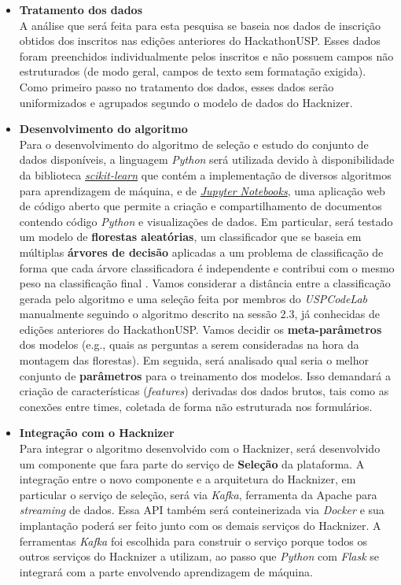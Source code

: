 \documentclass[10pt,twoside,a4paper]{article}
\begin{document}
      \begin{itemize}
          \item \textbf{Tratamento dos dados} \\
          A análise que será feita para esta pesquisa se baseia nos dados de inscrição obtidos dos inscritos nas edições anteriores do HackathonUSP. Esses dados foram preenchidos individualmente pelos inscritos e não possuem campos não estruturados (de modo geral, campos de texto sem formatação exigida). Como primeiro passo no tratamento dos dados, esses dados serão uniformizados e agrupados segundo o modelo de dados do Hacknizer.
      
          \item \textbf{Desenvolvimento do algoritmo} \\
          Para o desenvolvimento do algoritmo de seleção e estudo do conjunto de dados disponíveis, a linguagem \textit{Python} será utilizada devido à disponibilidade da biblioteca \href{http://scikit-learn.org}{\textit{scikit-learn}} que contém a implementação de diversos algoritmos para aprendizagem de máquina, e de \href{http://jupyter.org/}{\textit{Jupyter Notebooks}}, uma aplicação web de código aberto que permite a criação e compartilhamento de documentos contendo código \textit{Python} e visualizações de dados. Em particular, será testado um modelo de \textbf{florestas aleatórias}, um classificador que se baseia em múltiplas \textbf{árvores de decisão} aplicadas a um problema de classificação de forma que cada árvore classificadora é independente e contribui com o mesmo peso na classificação final \cite{Breiman2001RandomForests}. Vamos considerar a distância entre a classificação gerada pelo algoritmo e uma seleção feita por membros do \textit{USPCodeLab} manualmente seguindo o algoritmo descrito na sessão 2.3, já conhecidas de edições anteriores do HackathonUSP.
          Vamos decidir os \textbf{meta-parâmetros} dos modelos (e.g., quais as perguntas a serem consideradas na hora da montagem das florestas). Em seguida, será analisado qual seria o melhor conjunto de \textbf{parâmetros} para o treinamento dos modelos. Isso demandará a criação de características (\textit{features}) derivadas dos dados brutos, tais como as conexões entre times, coletada de forma não estruturada nos formulários.
          
          \item \textbf{Integração com o Hacknizer} \\
          Para integrar o algoritmo desenvolvido com o Hacknizer, será desenvolvido um componente que fara parte do serviço de \textbf{Seleção} da plataforma. A integração entre o novo componente e a arquitetura do Hacknizer, em particular o serviço de seleção, será via \textit{Kafka}, ferramenta da Apache para \textit{streaming} de dados. Essa API também será conteinerizada via \textit{Docker} e sua implantação poderá ser feito junto com os demais serviços do Hacknizer.
          A ferramentas \textit{Kafka} foi escolhida para construir o serviço porque todos os outros serviços do Hacknizer a utilizam, ao passo que \textit{Python} com \textit{Flask} se integrará com a parte envolvendo aprendizagem de máquina.
      \end{itemize}
\end{document}
